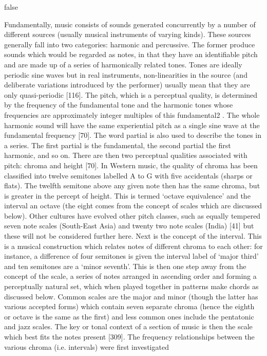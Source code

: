 \if false

Fundamentally, music consists of sounds generated concurrently by a number of different sources
(usually musical instruments of varying kinds). These sources generally fall into two categories:
harmonic and percussive. The former produce sounds which would be regarded as notes, in that
they have an identifiable pitch and are made up of a series of harmonically related tones. Tones
are ideally periodic sine waves but in real instruments, non-linearities in the source (and deliberate
variations introduced by the performer) usually mean that they are only quasi-periodic [116]. The
pitch, which is a perceptual quality, is determined by the frequency of the fundamental tone and
the harmonic tones whose frequencies are approximately integer multiples of this fundamental2 .
The whole harmonic sound will have the same experiential pitch as a single sine wave at the
fundamental frequency [70]. The word partial is also used to describe the tones in a series. The
first partial is the fundamental, the second partial the first harmonic, and so on.
There are then two perceptual qualities associated with pitch: chroma and height [70]. In
Western music, the quality of chroma has been classified into twelve semitones labelled A to G
with five accidentals (sharps or flats). The twelfth semitone above any given note then has the
same chroma, but is greater in the percept of height. This is termed ‘octave equivalence’ and the
interval an octave (the eight comes from the concept of scales which are discussed below). Other
cultures have evolved other pitch classes, such as equally tempered seven note scales (South-East
Asia) and twenty two note scales (India) [41] but these will not be considered further here.
Next is the concept of the interval. This is a musical construction which relates notes of
different chroma to each other: for instance, a difference of four semitones is given the interval
label of ‘major third’ and ten semitones are a ‘minor seventh’. This is then one step away from
the concept of the scale, a series of notes arranged in ascending order and forming a perceptually
natural set, which when played together in patterns make chords as discussed below. Common
scales are the major and minor (though the latter has various accepted forms) which contain
seven separate chroma (hence the eighth or octave is the same as the first) and less common ones
include the pentatonic and jazz scales. The key or tonal context of a section of music is then the
scale which best fits the notes present [309].
The frequency relationships between the various chroma (i.e. intervals) were first investigated
